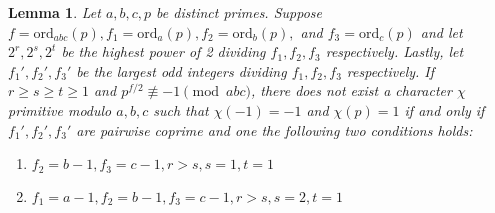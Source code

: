 \documentclass{article}
\newcommand{\ord}[0]{\mathrm{ord}}
\newtheorem{lemma}[theorem]{Lemma}
\theoremstyle{definition}
\theoremstyle{definition}
\theoremstyle{remark}
\begin{document}
\begin{lemma} \label{lem:char_prim_classification}  Let $a,b,c,p$ be distinct primes. Suppose $f = \ord_{abc}(p), f_1 = \ord_a(p), f_2 = \ord_b(p),$ and $f_3 = \ord_c(p)$ and let $2^r, 2^s, 2^t$ be the highest power of 2 dividing $f_1, f_2, f_3$ respectively. Lastly, let $f_1', f_2', f_3'$ be the largest odd integers dividing $f_1, f_2, f_3$ respectively. If $r \ge s \ge t \ge 1$ and $p^{f/2} \not\equiv -1 \pmod{abc}$, there does not exist a character $\chi$ primitive modulo $a,b,c$ such that $\chi(-1) = -1$ and $\chi(p) = 1$ if and only if $f_1', f_2', f_3'$ are pairwise coprime and one the following two conditions holds:
\begin{enumerate}
\item $f_2 = b - 1, f_3 = c - 1, r > s, s = 1, t = 1$
\item $f_1 = a - 1, f_2 = b - 1, f_3 = c - 1, r > s, s = 2, t = 1$
\end{enumerate}
\end{lemma}
\end{document}

